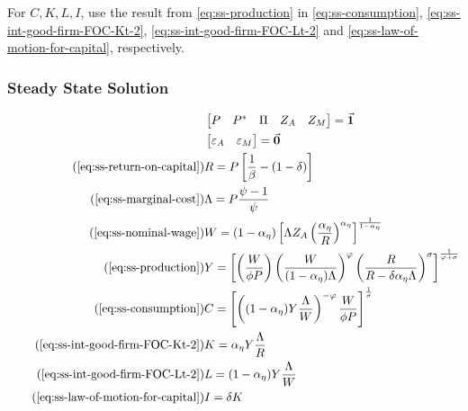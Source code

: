 \documentclass[
	12pt,
	]{article}
\numberwithin{equation}{section}
\theoremstyle{definition}
\theoremstyle{plain}
\theoremstyle{plain}
\theoremstyle{plain}
\begin{document}
For $C,K,L,I$, use the result from \ref{eq:ss-production} in \ref{eq:ss-consumption}, \ref{eq:ss-int-good-firm-FOC-Kt-2}, \ref{eq:ss-int-good-firm-FOC-Lt-2} and \ref{eq:ss-law-of-motion-for-capital}, respectively.


\subsubsection{Steady State Solution}

\vspace*{-1cm}

\begin{align}
	\label{eq:unity-vector}
	& \begin{bmatrix}
		P & P^\ast & \Pi & Z_A & Z_M
	\end{bmatrix} = \vec{\bm{1}} \\
	\label{eq:null-vector}
	& \begin{bmatrix}
		\varepsilon_A & \varepsilon_{M}
	\end{bmatrix} = \vec{\bm{0}}\\
	\tag{\ref{eq:ss-return-on-capital}}
	& R = P\left[ \frac{1}{\beta} - (1-\delta) \right] \\
	\tag{\ref{eq:ss-marginal-cost}}
	& \Lambda = P \frac{\psi-1}{\psi} \\
	\tag{\ref{eq:ss-nominal-wage}}
	& W = (1-{\alpha_\eta}) \left[ \Lambda Z_{A} \left( \frac{\alpha_\eta}{R} \right)^{\alpha_\eta} \right]^\frac{1}{1-{\alpha_\eta}} \\
	\tag{\ref{eq:ss-production}}
	& Y =\left[
	\left( \frac{W}{\phi P}                \right)
	\left( \frac{W}{(1-{\alpha_\eta})\Lambda}     \right)^\varphi
	\left( \frac{R}{R-\delta{\alpha_\eta}\Lambda} \right)^\sigma
	\right]^\frac{1}{\varphi+\sigma} \\
	\tag{\ref{eq:ss-consumption}}
	& C = \left[ \left( (1-{\alpha_\eta}) Y \frac{\Lambda}{W} \right)^{-\varphi} \frac{W}{\phi P} \right]^{\frac{1}{\sigma}} \\
	\tag{\ref{eq:ss-int-good-firm-FOC-Kt-2}}
	& K = {\alpha_\eta} Y \frac{\Lambda}{R} \\
	\tag{\ref{eq:ss-int-good-firm-FOC-Lt-2}}
	& L = (1-{\alpha_\eta}) Y \frac{\Lambda}{W} \\
	\tag{\ref{eq:ss-law-of-motion-for-capital}}
	& I = \delta K
\end{align}
\end{document}
